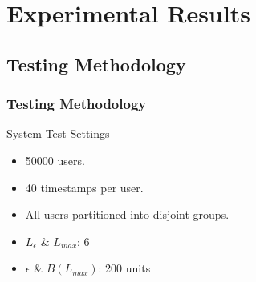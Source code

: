 \section{Experimental Results}

\subsection{Testing Methodology} %
\begin{frame}[red] %
\frametitle{Testing Methodology}

System Test Settings
\begin{itemize}
    \item 50000 users.
    \item 40 timestamps per user.
    \item All users partitioned into disjoint groups.
    \item $L_{\epsilon}$ \& $L_{max}$: 6
    \item $\epsilon$ \& $B(L_{max})$: 200 units
\end{itemize}
\end{frame}



